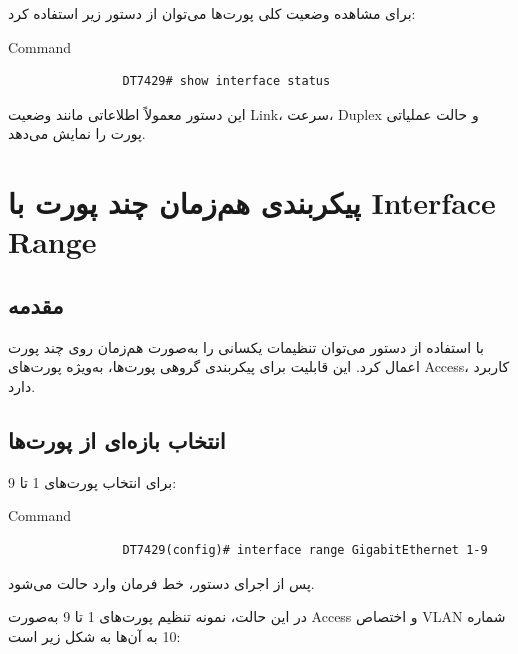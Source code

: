 \documentclass[11pt,letterpaper]{report}
\begin{document}
		برای مشاهده وضعیت کلی پورت‌ها می‌توان از دستور زیر استفاده کرد:

		\begin{latin}
			\begin{cliexample}{Command}
				\begin{verbatim}
				DT7429# show interface status
				\end{verbatim}
			\end{cliexample}
		\end{latin}

		این دستور معمولاً اطلاعاتی مانند وضعیت Link، سرعت، Duplex و حالت
		عملیاتی پورت را نمایش می‌دهد.


		\iffalse

		\chapter{پیکربندی هم‌زمان چند پورت با Interface Range}

		\section{مقدمه}

		با استفاده از دستور  می‌توان تنظیمات یکسانی
		را به‌صورت هم‌زمان روی چند پورت اعمال کرد. این قابلیت برای
		پیکربندی گروهی پورت‌ها، به‌ویژه پورت‌های Access، کاربرد دارد.

		\section{انتخاب بازه‌ای از پورت‌ها}

		برای انتخاب پورت‌های 1 تا 9:

		\begin{latin}
			\begin{cliexample}{Command}
				\begin{verbatim}
				DT7429(config)# interface range GigabitEthernet 1-9
				\end{verbatim}
			\end{cliexample}
		\end{latin}

		پس از اجرای دستور، خط فرمان وارد حالت
		 می‌شود.

		در این حالت، نمونه تنظیم پورت‌های 1 تا 9 به‌صورت Access و
		اختصاص VLAN شماره 10 به آن‌ها به شکل زیر است:
\end{document}
